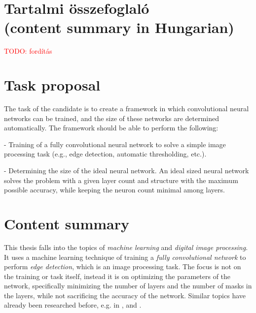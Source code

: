 \documentclass[12pt]{report}
\newcommand\todo[1]{\textcolor{red}{#1}}
\begin{document}
\begingroup
	\hypersetup{hidelinks}
	\tableofcontents
\endgroup


\chapter*{Tartalmi összefoglaló\\(content summary in Hungarian)}

\todo{TODO: fordítás}

\chapter*{Task proposal}

The task of the candidate is to create a framework in which convolutional neural networks can be trained, and the size of these networks are determined automatically. The framework should be able to perform the following:

- Training of a fully convolutional neural network to solve a simple image processing task (e.g., edge detection, automatic thresholding, etc.).

- Determining the size of the ideal neural network. An ideal sized neural network solves the problem with a given layer count and structure with the maximum possible accuracy, while keeping the neuron count minimal among layers.

\chapter*{Content summary}

This thesis falls into the topics of \textit{machine learning} and \textit{digital image processing}. It uses a machine learning technique of training a \textit{fully convolutional network} to perform \textit{edge detection}, which is an image processing task. The focus is not on the training or task itself, instead it is on optimizing the parameters of the network, specifically minimizing the number of layers and the number of masks in the layers, while not sacrificing the accuracy of the network. Similar topics have already been researched before, e.g. in \cite{pruning_web}, \cite{pruning_arxiv} and \cite{understanding}.
\end{document}
